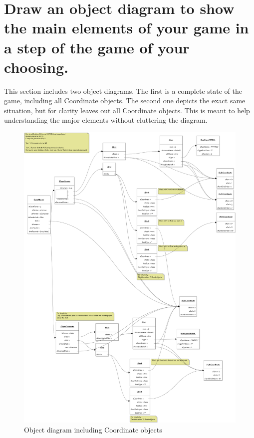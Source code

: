 \documentclass{article}
\begin{document}
\newpage
\section{Draw an object diagram to show the main elements of your game in a step of the game of your choosing.}
This section includes two object diagrams. The first is a complete state of the game, including all Coordinate objects. The second one depicts the exact same situation, but for clarity leaves out all Coordinate objects. This is meant to help understanding the major elements without cluttering the diagram.  

\begin{figure}[h]
\centering
\includegraphics[width = 0.9\linewidth]{images/object_diagram.png}
\caption{Object diagram including Coordinate objects}
\end{figure}
\end{document}
